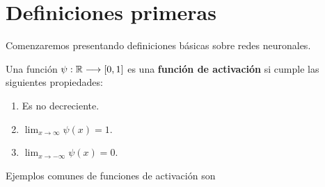 %

\section{Definiciones primeras}\label{ch:articulo:sec:defincionesPrimeras}  

Comenzaremos presentando definiciones básicas sobre redes neuronales. 


\begin{definicion} \label{def:funcion_activacion_articulo}
    Una función  $\psi: \mathbb{R} \longrightarrow [0,1]$ es una \textbf{ función de activación} si  cumple las siguientes propiedades:
    \begin{enumerate}[label=(\roman*)]
        \item Es no decreciente.
        \item $\lim _{x \rightarrow \infty} \psi(x) = 1
        $.
        \item $\lim _{x \rightarrow -\infty} \psi(x) = 0$.
    \end{enumerate}  
   
    Ejemplos comunes de funciones de activación son



\end{definicion}
